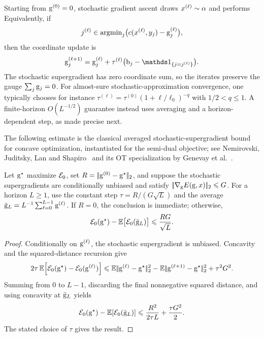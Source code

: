 Starting from $\mathrm{g}^{(0)}=0$, stochastic gradient ascent draws $x^{(\ell)}\sim\alpha$ and performs
Equivalently, if
\[
	j^{(\ell)}\in\operatorname{argmin}_j\bigl(c(x^{(\ell)},y_j)-\mathrm{g}_j^{(\ell)}\bigr),
\]
then the coordinate update is
\[
	\gD_j^{(\ell+1)}
	=
	\gD_j^{(\ell)}
	+
	\tau^{(\ell)}\bigl(\b_j-\ones_{\{j=j^{(\ell)}\}}\bigr).
\]
The stochastic supergradient has zero coordinate sum, so the iterates preserve the gauge $\sum_j\mathrm{g}_j=0$. For almost-sure stochastic-approximation convergence, one typically chooses
for instance $\tau^{(\ell)}=\tau^{(0)}(1+\ell/\ell_0)^{-q}$ with $1/2<q\leq1$. A finite-horizon $O(L^{-1/2})$ guarantee instead uses averaging and a horizon-dependent step, as made precise next.

The following estimate is the classical averaged stochastic-supergradient bound for concave optimization, instantiated for the semi-dual objective; see Nemirovski, Juditsky, Lan and Shapiro~\cite{nemirovski2009robust} and its OT specialization by Genevay et al.~\cite{genevay2016stochastic}.
\begin{prop}\label{prop-semidiscrete-sgd-rate}
	Let $\mathrm{g}^\star$ maximize $\mathcal{E}_0$, set $R=|\!| \mathrm{g}^{(0)}-\mathrm{g}^\star |\!|_2$, and suppose the stochastic supergradients are conditionally unbiased and satisfy $|\!| \nabla_{\mathrm{g}} E(\mathrm{g},x) |\!|_2\leqslant G$. For a horizon $L\geq1$, use the constant step $\tau=R/(G\sqrt L)$ and the average $\bar{\mathrm{g}}_L=L^{-1}\sum_{\ell=0}^{L-1}\mathrm{g}^{(\ell)}$. If $R=0$, the conclusion is immediate; otherwise,
	\[
		\mathcal{E}_0(\mathrm{g}^\star)-\mathbb{E}\bigl[\mathcal{E}_0(\bar{\mathrm{g}}_L)\bigr]
		\leqslant
		\frac{RG}{\sqrt L}.
	\]
\end{prop}
\begin{proof}
	Conditionally on $\mathrm{g}^{(\ell)}$, the stochastic supergradient is unbiased. Concavity and the squared-distance recursion give
	\[
		2\tau\,\mathbb{E}\!\left[\mathcal{E}_0(\mathrm{g}^\star)-\mathcal{E}_0(\mathrm{g}^{(\ell)})\right]
		\leqslant
		\mathbb{E}|\!| \mathrm{g}^{(\ell)}-\mathrm{g}^\star |\!|_2^2
		-
		\mathbb{E}|\!| \mathrm{g}^{(\ell+1)}-\mathrm{g}^\star |\!|_2^2
		+
		\tau^2G^2.
	\]
	Summing from $0$ to $L-1$, discarding the final nonnegative squared distance, and using concavity at $\bar{\mathrm{g}}_L$ yields
	\[
		\mathcal{E}_0(\mathrm{g}^\star)-\mathbb{E}\!\left[\mathcal{E}_0(\bar{\mathrm{g}}_L)\right]
		\leqslant
		\frac{R^2}{2\tau L}+\frac{\tau G^2}{2}.
	\]
	The stated choice of $\tau$ gives the result.
\end{proof}

